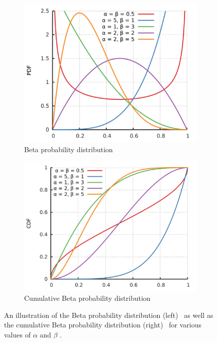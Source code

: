 \begin{figure}[htbp]
      \begin{subfigure}{0.49\textwidth}
            \centering
            \includegraphics[width=\textwidth]{images/beta_various.pdf}
            \caption{Beta probability distribution}
            \label{fig:probability:probability_distributions:beta_normal}
      \end{subfigure}
      \begin{subfigure}{0.49\textwidth}
            \centering
            \includegraphics[width=\textwidth]{images/beta_cumulative.pdf}
            \caption{Cumulative Beta probability distribution}
            \label{fig:probability:probability_distributions:beta_cumulative}
      \end{subfigure}
      \par\bigskip
      \caption{An illustration of the Beta probability distribution (left)~\cite{ref:beta:2014} as well as the cumulative Beta probability distribution (right)~\cite{ref:cumulativebeta:2014} for various values of $\alpha$ and $\beta$ .}
      \label{fig:probability:probability_distributions:beta}
\end{figure}

